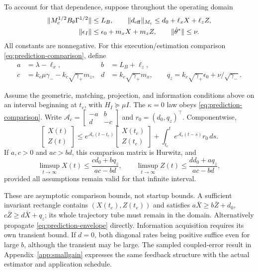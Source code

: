 To account for that dependence, suppose throughout the operating domain
\begin{align}
 \|M_c^{1/2}B_\theta\Gamma^{1/2}\|&\le L_B,\qquad
 \|d_{\rm eff}\|_{M_c}\le d_0+\ell_xX+\ell_zZ,\nonumber\\
 \|\epsilon_I\|&\le\epsilon_0+m_xX+m_zZ,
 \qquad \|\dot\theta^*\|\le\nu.
 \label{eq:gen-coupling}
\end{align}
All constants are nonnegative. For this execution/estimation comparison
\eqref{eq:prediction-comparison}, define
\begin{align}
 a&=\lambda-\ell_x,& b&=L_B+\ell_z,\nonumber\\
 c&=k_c\mu\gamma_- -k_c\sqrt{\gamma_+}m_z,&
 d&=k_c\sqrt{\gamma_+}m_x,\qquad
 q_z=k_c\sqrt{\gamma_+}\epsilon_0+\nu/\sqrt{\gamma_-}.
 \label{eq:prediction-coefficients}
\end{align}
\begin{proposition}
\label{prop:prediction-comparison}
Assume the geometric, matching, projection, and information conditions
above on an interval beginning at $t_e$, with $H_I\succeq\mu I$.
The $\kappa=0$ law obeys \eqref{eq:prediction-comparison}. Write
$\mathcal A_c=\left[\begin{smallmatrix}-a&b\\d&-c\end{smallmatrix}\right]$
and $r_0=(d_0,q_z)^\top$. Componentwise,
\begin{equation}
 \begin{bmatrix}X(t)\\Z(t)\end{bmatrix}\le
 e^{\mathcal A_c(t-t_e)}\begin{bmatrix}X(t_e)\\Z(t_e)\end{bmatrix}
 +\int_{t_e}^t e^{\mathcal A_c(t-s)}r_0\,ds.
 \label{eq:prediction-envelope}
\end{equation}
If $a,c>0$ and $ac>bd$, this comparison matrix is Hurwitz, and
\begin{equation}
 \limsup_{t\to\infty}X(t)\le\frac{cd_0+bq_z}{ac-bd},\qquad
 \limsup_{t\to\infty}Z(t)\le\frac{dd_0+aq_z}{ac-bd},
 \label{eq:prediction-floor}
\end{equation}
provided all assumptions remain valid for that infinite interval.
\end{proposition}
These are asymptotic comparison bounds, not startup bounds. A sufficient
invariant rectangle contains $(X(t_e),Z(t_e))$ and satisfies
$a\bar X\ge b\bar Z+d_0$, $c\bar Z\ge d\bar X+q_z$; its whole
trajectory tube must remain in the domain. Alternatively propagate
\eqref{eq:prediction-envelope} directly. Information acquisition requires
its own transient bound. If $d=0$, both diagonal rates being positive
suffice even for large $b$, although the transient may be large.
The sampled coupled-error result in Appendix~\ref{app:smallgain} expresses
the same feedback structure with the actual estimator and application schedule.

